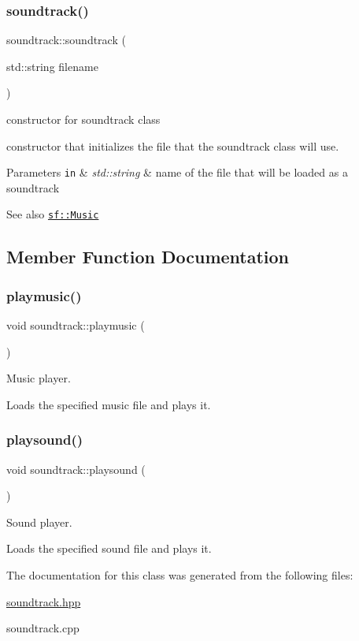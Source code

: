 \subsubsection{\texorpdfstring{soundtrack()}{soundtrack()}}
{\footnotesize\ttfamily soundtrack\+::soundtrack (\begin{DoxyParamCaption}\item[{std\+::string}]{filename }\end{DoxyParamCaption})}



constructor for soundtrack class 

constructor that initializes the file that the soundtrack class will use.


\begin{DoxyParams}[1]{Parameters}
\mbox{\tt in}  & {\em std\+::string} & name of the file that will be loaded as a soundtrack\\
\hline
\end{DoxyParams}
\begin{DoxySeeAlso}{See also}
\href{http://www.sfml-dev.org/documentation/2.0/classsf_1_1Music.php}{\tt sf\+::\+Music} 
\end{DoxySeeAlso}


\subsection{Member Function Documentation}
\mbox{\label{classsoundtrack_a7569a4c0cde86548197756b8e05cf464}} 
\subsubsection{\texorpdfstring{playmusic()}{playmusic()}}
{\footnotesize\ttfamily void soundtrack\+::playmusic (\begin{DoxyParamCaption}{ }\end{DoxyParamCaption})}



Music player. 

Loads the specified music file and plays it. \mbox{\label{classsoundtrack_a9fbceb68f3fc032d79b4150deff560ea}} 
\subsubsection{\texorpdfstring{playsound()}{playsound()}}
{\footnotesize\ttfamily void soundtrack\+::playsound (\begin{DoxyParamCaption}{ }\end{DoxyParamCaption})}



Sound player. 

Loads the specified sound file and plays it. 

The documentation for this class was generated from the following files\+:\begin{DoxyCompactItemize}
\item 
\hyperlink{soundtrack_8hpp}{soundtrack.\+hpp}\item 
soundtrack.\+cpp\end{DoxyCompactItemize}
